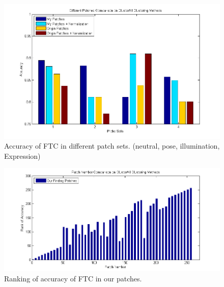 \documentclass[10pt,twocolumn,letterpaper]{article}
\begin{document}
\begin{figure}[t]
    \begin{center}
        \includegraphics[width=0.8\linewidth]{fig/ftc/ftc_ownpatch.png}
    \end{center}
    \caption{Accuracy of FTC in different patch sets. (neutral, pose, illumination, Expression)}
    \label{fig:ftc_ownpatch}
\end{figure}

\begin{figure}[t]
    \begin{center}
        \includegraphics[width=0.8\linewidth]{fig/ftc/ftc_rank.png}
    \end{center}
    \caption{Ranking of accuracy of FTC in our patches.}
    \label{fig:ftc_rank}
\end{figure}
\end{document}
